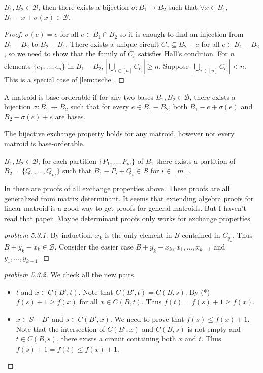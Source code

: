 \begin{theorem}
    $B_1,B_2\in \mathcal B$, then there exists a bijection $\sigma: B_1\to B_2$ such that $\forall x\in B_1$, $B_1-x+\sigma(x)\in \mathcal B$.
\end{theorem}
\begin{proof}
    $\sigma(e)=e$ for all $e\in B_1\cap B_2$ so it is enough to find an injection from $B_1-B_2$ to $B_2-B_1$. There exists a unique circuit $C_e\subseteq B_2+e$ for all $e\in B_1-B_2$, so we need to show that the family of $C_e$ satisfies Hall's condition. For $n$ elements $\{e_1,\ldots,e_n\}$ in $B_1-B_2$, $|\bigcup_{i\in[n]}C_{e_i}|\geq n$. Suppose $|\bigcup_{i\in[n]}C_{e_i}|< n$. This is a special case of \autoref{lem:asche}.
    
\end{proof}
\begin{definition}
    A matroid is base-orderable if for any two bases $B_1,B_2\in \mathcal B$, there exists a bijection $\sigma: B_1\to B_2$ such that for every $e\in B_1-B_2$, both $B_1-e+\sigma(e)$ and $B_2-\sigma(e)+e$ are bases.
\end{definition}

The bijective exchange property holds for any matroid, however not every matroid is base-orderable.

\begin{theorem}
    $B_1,B_2\in \mathcal B$, for each partition $\{P_1,\dots,P_m\}$ of $B_1$ there exists a partition of $B_2=\{Q_1,\dots,Q_m\}$ such that $B_1-P_i+Q_i\in \mathcal B$ for $i\in [m]$.
\end{theorem}

In \cite{Greene_Magnanti_1975} there are proofs of all exchange properties above. These proofs are all generalized from matrix determinant. It seems that extending algebra proofs for linear matroid is a good way to get proofs for general matroids. But I haven't read that paper. Maybe determinant proofs only works for exchange properties.

\begin{proof}[problem 5.3.1]
    By induction. $x_k$ is the only element in $B$ contained in $C_{y_k}$. Thus $B+y_k-x_k\in \mathcal B$. Consider the easier case $B+y_k-x_k$, $x_1,\dots,x_{k-1}$ and $y_1,\dots,y_{k-1}$.
\end{proof}

\begin{proof}[problem 5.3.2]
    We check all the new pairs.
    \begin{itemize}
        \item $t$ and $x\in C(B',t)$. Note that $C(B',t)=C(B,s)$. By (*) $f(s)+1\geq f(x)$ for all $x\in C(B,t)$. Thus $f(t)=f(s)+1\geq f(x)$.
        \item $x\in S-B'$ and $s\in C(B',x)$. We need to prove that $f(s)
        \leq f(x)+1$. Note that the intersection of $C(B',x)$ and $C(B,s)$ is not empty and $t\in C(B,s)$, there exists a circuit containing both $x$ and $t$. Thus $f(s)+1=f(t)\leq f(x)+1$.
    \end{itemize}
\end{proof}

